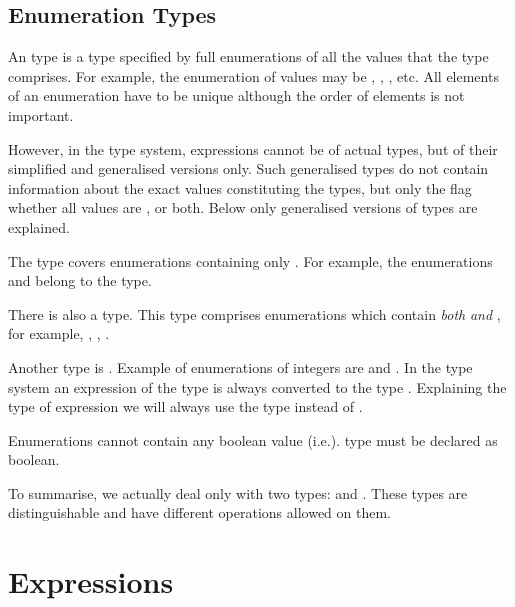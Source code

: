 \subsection{Enumeration Types}
\label{Enumeration Types}

An \Enum type is a type specified by full enumerations of all the values
that the type comprises.  For example, the enumeration of values may be
, , , etc.  All elements of an enumeration have
to be unique although the order of elements is not important.

However, in the \nusmv type system, expressions cannot be of actual
\Enum types, but of their simplified and generalised versions
only. Such generalised \Enum types do not contain information about
the exact values constituting the types, but only the flag whether all
values are  ,
 or both. Below only generalised versions
of \Enum types are explained.

The \SymbEnum type covers enumerations containing only . For example, the enumerations 
and  belong to the \SymbEnum type.

There is also a \IntSymbEnum type. 
This type comprises enumerations which contain \emph{both}
 \emph{and} , for
example, , ,
.

Another \Enum type is \IntEnum.
Example of enumerations of integers are  and . 
In the \nusmv type system an expression of the type \IntEnum
is always converted to the type \Integer. Explaining
the type of expression we will always use the type \Integer
instead of \IntEnum.

Enumerations cannot contain any boolean value (i.e.).
\Boolean type must be declared as boolean.

To summarise, we actually deal only with two \Enum types: \SymbEnum and
\IntSymbEnum. These types are distinguishable and have different operations
allowed on them.


\section{Expressions}
\label{Expressions}
%


